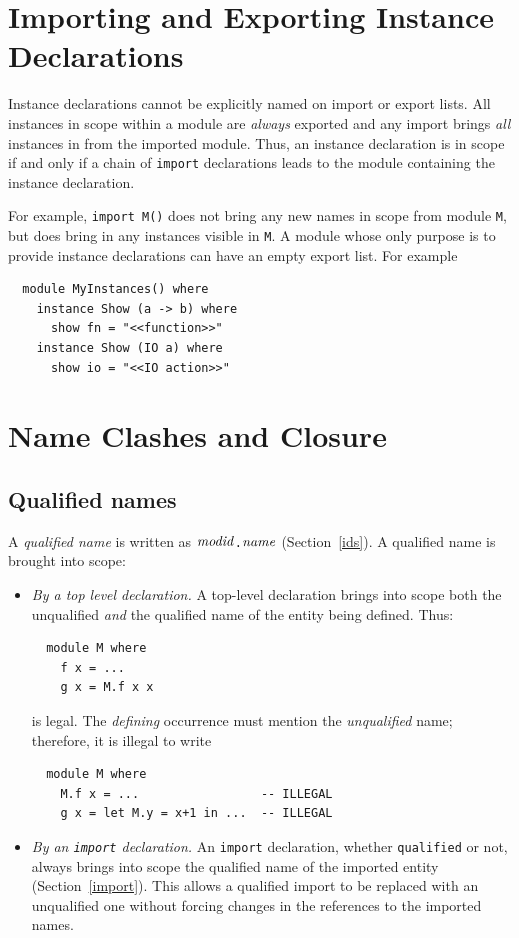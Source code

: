 \section{Importing and Exporting Instance Declarations}
\label{import-instances}

Instance declarations cannot be explicitly named on import or export
lists.  All instances in scope within a module are {\em always}
exported and any import brings {\em all} instances in from the
imported module.  Thus, an
instance declaration is in scope if and only if a chain of \mbox{\tt import}
declarations leads to the module containing the instance declaration.

For example, \mbox{\tt import\ M()} does not bring
any new names in scope from module \mbox{\tt M}, but does bring in any instances
visible in \mbox{\tt M}.  A module whose only purpose is to provide instance
declarations can have an empty export list.  For example
\bprog
{\small\begin{verbatim}
  module MyInstances() where
    instance Show (a -> b) where
      show fn = "<<function>>"
    instance Show (IO a) where
      show io = "<<IO action>>"
\end{verbatim}}
\eprog

\section{Name Clashes and Closure}

\subsection{Qualified names}
\label{qualifiers}

A {\em qualified name} is written as \mbox{$\it modid$}\mbox{\tt .}\mbox{$\it name$} (Section~\ref{ids}).
A qualified name is brought into scope:
\begin{itemize}
\item {\em By a top level declaration.}
A top-level declaration brings into scope both the unqualified {\em and}
the qualified name of the entity being defined.  Thus:
\bprog
{\small\begin{verbatim}
  module M where
    f x = ...
    g x = M.f x x
\end{verbatim}}
\eprog
is legal.  The {\em defining} occurrence must mention the {\em unqualified} name; therefore, it is
illegal to write
\bprog
{\small\begin{verbatim}
  module M where
    M.f x = ...                 -- ILLEGAL
    g x = let M.y = x+1 in ...  -- ILLEGAL
\end{verbatim}}
\eprog
\item {\em By an \mbox{\tt import} declaration.}  An \mbox{\tt import} declaration, whether \mbox{\tt qualified} or not,
always brings into scope the qualified name of the imported entity (Section~\ref{import}).
This allows a qualified
import to be replaced with an unqualified one without forcing changes
in the references to the imported names.  
\end{itemize}


